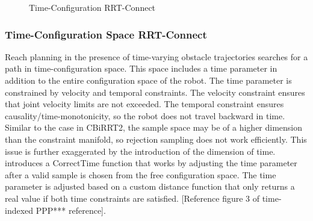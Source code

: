\documentclass[12pt]{article}
\begin{document}
            \begin{figure}[ht]
                \quad
                \caption{Time-Configuration RRT-Connect}
                \label{fig:time_rrt}
            \end{figure}

        \subsubsection{Time-Configuration Space RRT-Connect}
            Reach planning in the presence of time-varying obstacle trajectories searches for a path in time-configuration space. This space includes a time parameter in addition to the entire configuration space of the robot. The time parameter is constrained by velocity and temporal constraints. The velocity constraint ensures that joint velocity limits are not exceeded. The temporal constraint ensures causality/time-monotonicity, so the robot does not travel backward in time. Similar to the case in CBiRRT2, the sample space may be of a higher dimension than the constraint manifold, so rejection sampling does not work efficiently. This issue is further exaggerated by the introduction of the dimension of time. \cite{yang_planning_2018} introduces a CorrectTime function that works by adjusting the time parameter after a valid sample is chosen from the free configuration space. The time parameter is adjusted based on a custom distance function that only returns a real value if both time constraints are satisfied. [Reference figure 3 of time-indexed PPP*** reference].
\end{document}

